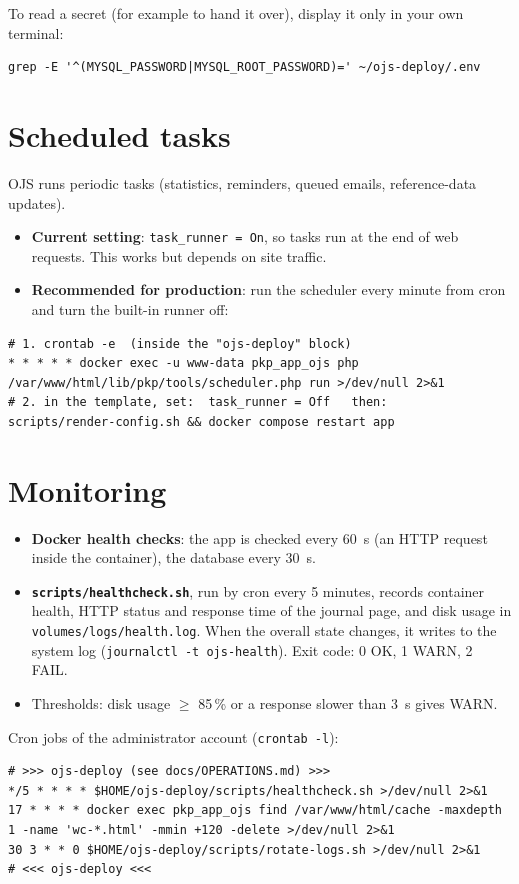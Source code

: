 \documentclass[11pt,a4paper]{report}
\newcommand{\code}[1]{\texttt{\small #1}}
\newcommand{\file}[1]{\texttt{\small #1}}
\begin{document}
To read a secret (for example to hand it over), display it only in your own terminal:
\begin{lstlisting}
grep -E '^(MYSQL_PASSWORD|MYSQL_ROOT_PASSWORD)=' ~/ojs-deploy/.env
\end{lstlisting}

\section{Scheduled tasks}
OJS runs periodic tasks (statistics, reminders, queued emails, reference-data updates).
\begin{itemize}
  \item \textbf{Current setting}: \code{task\_runner = On}, so tasks run at the end of web requests.
        This works but depends on site traffic.
  \item \textbf{Recommended for production}: run the scheduler every minute from cron and turn the
        built-in runner off:
\end{itemize}
\begin{lstlisting}
# 1. crontab -e  (inside the "ojs-deploy" block)
* * * * * docker exec -u www-data pkp_app_ojs php /var/www/html/lib/pkp/tools/scheduler.php run >/dev/null 2>&1
# 2. in the template, set:  task_runner = Off   then:
scripts/render-config.sh && docker compose restart app
\end{lstlisting}

\section{Monitoring}
\begin{itemize}
  \item \textbf{Docker health checks}: the app is checked every 60~s (an HTTP request inside the
        container), the database every 30~s.
  \item \textbf{\file{scripts/healthcheck.sh}}, run by cron every 5 minutes, records container
        health, HTTP status and response time of the journal page, and disk usage in
        \file{volumes/logs/health.log}. When the overall state changes, it writes to the system
        log (\code{journalctl -t ojs-health}). Exit code: 0 OK, 1 WARN, 2 FAIL.
  \item Thresholds: disk usage $\geq$ 85\,\% or a response slower than 3~s gives WARN.
\end{itemize}

Cron jobs of the administrator account (\code{crontab -l}):
\begin{lstlisting}
# >>> ojs-deploy (see docs/OPERATIONS.md) >>>
*/5 * * * * $HOME/ojs-deploy/scripts/healthcheck.sh >/dev/null 2>&1
17 * * * * docker exec pkp_app_ojs find /var/www/html/cache -maxdepth 1 -name 'wc-*.html' -mmin +120 -delete >/dev/null 2>&1
30 3 * * 0 $HOME/ojs-deploy/scripts/rotate-logs.sh >/dev/null 2>&1
# <<< ojs-deploy <<<
\end{lstlisting}
\end{document}
